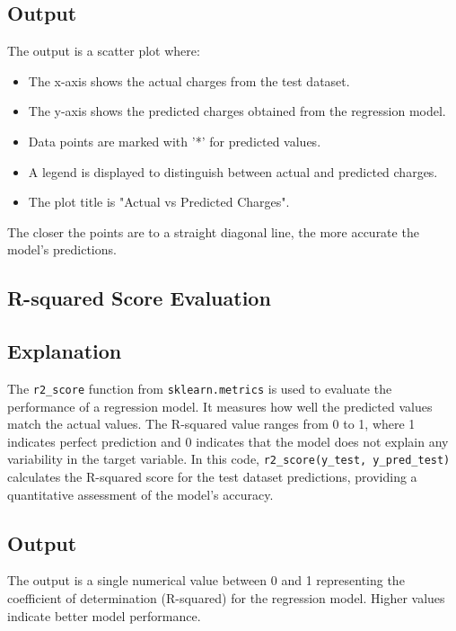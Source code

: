 \documentclass[11pt]{article}
\begin{document}
\subsection*{Output}
The output is a scatter plot where:
\begin{itemize}
    \item The x-axis shows the actual charges from the test dataset.
    \item The y-axis shows the predicted charges obtained from the regression model.
    \item Data points are marked with '*' for predicted values.
    \item A legend is displayed to distinguish between actual and predicted charges.
    \item The plot title is "Actual vs Predicted Charges".
\end{itemize}

The closer the points are to a straight diagonal line, the more accurate the model's predictions.


    \begin{center}
    \end{center}
  \newpage
 
 
\subsection{R-squared Score Evaluation}

\subsection*{Explanation}
The \texttt{r2\_score} function from \texttt{sklearn.metrics} is used to evaluate the performance of a regression model. It measures how well the predicted values match the actual values. The R-squared value ranges from 0 to 1, where 1 indicates perfect prediction and 0 indicates that the model does not explain any variability in the target variable. In this code, \texttt{r2\_score(y\_test, y\_pred\_test)} calculates the R-squared score for the test dataset predictions, providing a quantitative assessment of the model's accuracy.

\subsection*{Output}
The output is a single numerical value between 0 and 1 representing the coefficient of determination (R-squared) for the regression model. Higher values indicate better model performance.
   
\end{document}
